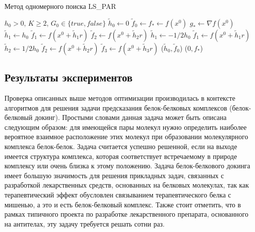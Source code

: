   \begin{algorithm}[!h]
    \caption{Метод одномерного поиска LS\_PAR}
    \label{LS_PAR_ALGORITHM}
    $h_0 > 0$, $K \ge 2$, $G_0 \in \{ true, false\}$\;
    $\tilde{h}_0 \leftarrow 0$\;
    $\tilde{f}_0 \leftarrow f_* \leftarrow f(x^0)$ 
     {
      $g_* \leftarrow \nabla f(x^0)$ 
      $\tilde{h}_1 \leftarrow h_0$\;
      $\tilde{f}_1 \leftarrow f(x^0 + \tilde{h}_1 r)$\;
      $\tilde{f}_2 \leftarrow f(x^0 + \tilde{h}_2 r)$\;
    }{
      $\tilde{h}_1 \leftarrow -1/2 h_0$\;
      $\tilde{f}_1 \leftarrow f(x^0 + \tilde{h}_1 r)$\;
      $\tilde{h}_2 \leftarrow  1/2 h_0$\;
      $\tilde{f}_2 \leftarrow f(x^0 + \tilde{h}_2 r)$\;
    }
     {
      $\tilde{f}_3 \leftarrow f(x^0 + \tilde{h}_3 r)$\;
    }
     {
    }
     {
      \Return ($\tilde{h}_0, \tilde{f}_0$)\;
    }
    \Return ($0, f_*$) 
  \end{algorithm}
  \fi

\subsection{Результаты экспериментов}

  Проверка описанных выше методов оптимизации производилась в контексте алгоритмов для решения задачи предсказания белок-белковых комплексов (белок-белковый докинг). Простыми словами данная задача может быть описана следующим образом: для имеющейся пары молекул нужно определить наиболее вероятное взаимное расположение этих молекул при образовании молекулярного комплекса белок-белок. Задача считается успешно решенной, если на выходе имеется структура комплекса, которая соответствует встречаемому в природе комплексу или очень близка к этому положению. Задача белок-белкового докинга имеет большую значимость для решения прикладных задач, связанных с разработкой лекарственных средств, основанных на белковых молекулах, так как терапевтический эффект обусловлен связыванием терапевтического белка с мишенью, а это и есть белок-белковый комплекс. Также стоит отметить, что в рамках типичного проекта по разработке лекарственного препарата, основанного на антителах,
  эту задачу требуется решать сотни раз.

